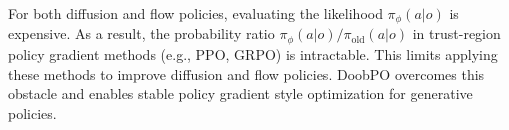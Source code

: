 For both diffusion and flow policies, evaluating the likelihood $\pi_\phi(a|o)$ is expensive.
As a result, the probability ratio
$\pi_\phi(a|o)/\pi_{\mathrm{old}}(a|o)$ in trust-region policy gradient methods (e.g., PPO, GRPO) is intractable.
This limits applying these methods to improve diffusion and flow policies.
DoobPO overcomes this obstacle and enables stable policy gradient style optimization for generative policies.